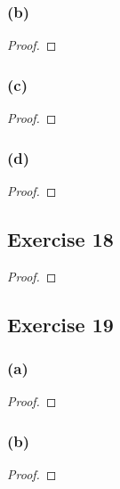 \documentclass[14pt]{extarticle}
\begin{document}
\subsubsection{(b)}

\begin{proof}

\end{proof}

\subsubsection{(c)}

\begin{proof}

\end{proof}

\subsubsection{(d)}

\begin{proof}

\end{proof}

\subsection{Exercise 18}

\begin{proof}

\end{proof}

\subsection{Exercise 19}

\subsubsection{(a)}

\begin{proof}

\end{proof}

\subsubsection{(b)}

\begin{proof}

\end{proof}
\end{document}
